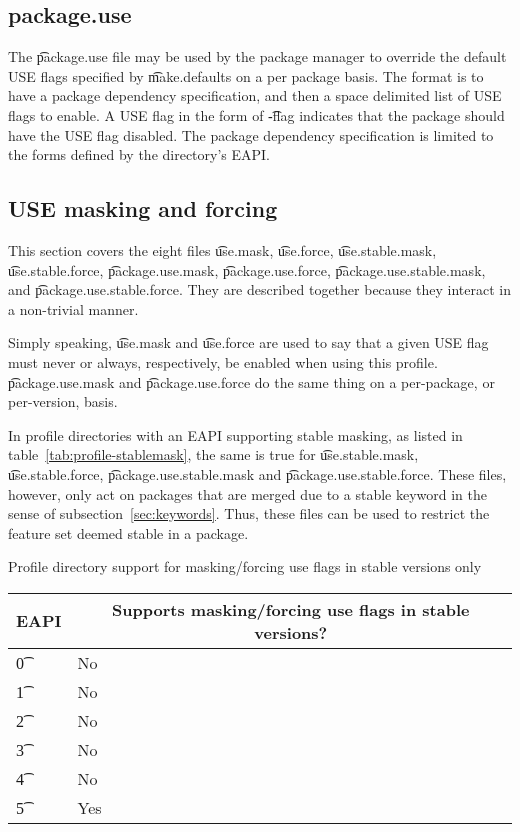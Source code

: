 \subsection{package.use}
The \t{package.use} file may be used by the package manager to override the default USE flags specified
by \t{make.defaults} on a per package basis.  The format is to have a package dependency specification,
and then a space delimited list of USE flags to enable.  A USE flag in the form of \t{-flag} indicates
that the package should have the USE flag disabled.  The package dependency specification is limited to
the forms defined by the directory's EAPI.

\subsection{USE masking and forcing}
\label{sec:use-masking}
This section covers the eight files \t{use.mask}, \t{use.force}, \t{use.stable.mask},
\t{use.stable.force}, \t{package.use.mask}, \t{package.use.force}, \t{package.use.stable.mask},
and \t{package.use.\allowbreak stable.force}. They are described together because they interact in
a non-trivial manner.

Simply speaking, \t{use.mask} and \t{use.force} are used to say that a given USE flag must never or
always, respectively, be enabled when using this profile. \t{package.use.mask} and
\t{package.use.force} do the same thing on a per-package, or per-version, basis.

In profile directories with an EAPI supporting stable masking, as listed in
table~\ref{tab:profile-stablemask}, the same is true for \t{use.stable.mask}, \t{use.stable.force},
\t{package.use.stable.mask} and \t{package.use.\allowbreak stable.force}. These files, however,
only act on packages that are merged due to a stable keyword in the sense of
subsection~\ref{sec:keywords}. Thus, these files can be used to restrict the feature set deemed
stable in a package.

\begin{centertable}{Profile directory support for masking/forcing use flags in stable
versions only}\label{tab:profile-stablemask}
    \begin{tabular}{ l l }
        \toprule
        \multicolumn{1}{c}{\textbf{EAPI}} &
        \multicolumn{1}{c}{\textbf{Supports masking/forcing use flags in stable versions?}} \\
        \midrule
    \t{0} & No \\
    \t{1} & No \\
    \t{2} & No \\
    \t{3} & No \\
    \t{4} & No \\
    \t{5} & Yes \\
    \bottomrule
    \end{tabular}
\end{centertable}

